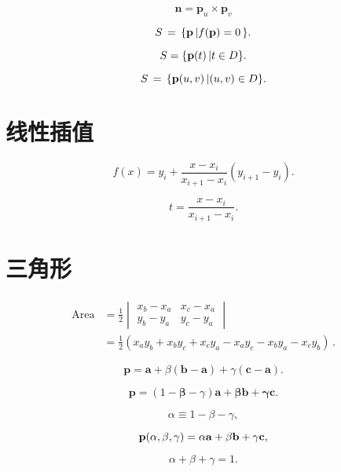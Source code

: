 \[
  \mathbf{n}=\mathbf{p}_{u}\times\mathbf{p}_{v}
\]

\[
  S\,=\,\{{\bf p}\,|f({\bf p})=0\,\}.
\]

\[
  S=\{{\bf p}(t)\,|t\in D\}.
\]

\[
  S\,=\,\{{\bf p}(u,v)\,|(u,v)\in D\}.
\]

\section{线性插值}

\begin{equation}
  f(x)=y_{i}+{\frac{x-x_{i}}{x_{i+1}-x_{i}}}(y_{i+1}-y_{i}).
\end{equation}

\[
  t={\frac{x-x_{i}}{x_{i+1}-x_{i}}}.
\]

\section{三角形}

\begin{equation}
  \begin{aligned}
    \mathrm{Area} & = \frac{1}{2}
    \begin{vmatrix}
      x_b-x_a & x_c-x_a \\
      y_b-y_a & y_c-y_a
    \end{vmatrix}                                                                                   \\
                  & = \frac{1}{2}(x_{a}y_{b}+x_{b}y_{c}+x_{c}y_{a}-x_{a}y_{c}-x_{b}y_{a}-x_{c}y_{b})\,.
  \end{aligned}
\end{equation}

\begin{equation}
  \mathbf{p}=\mathbf{a}+\beta(\mathbf{b}-\mathbf{a})+\gamma(\mathbf{c}-\mathbf{a}).
\end{equation}

\[
  \mathbf{p}=(1-{\boldsymbol{\beta}}-\gamma)\mathbf{a}+{\boldsymbol{\beta}}\mathbf{b}+{\boldsymbol{\gamma}}\mathbf{c}.
\]

\[
  \alpha\equiv1-\beta-\gamma,
\]

\begin{equation}
  {\bf p}(\alpha,\beta,\gamma)=\alpha{\bf a}+\beta{\bf b}+\gamma{\bf c},
\end{equation}

\begin{equation}
  \alpha+\beta+\gamma=1.
\end{equation}

